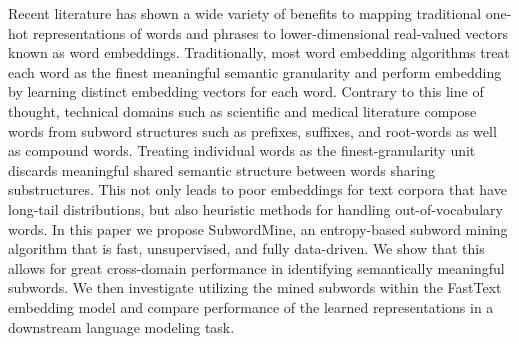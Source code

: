 Recent literature has shown a wide variety of benefits to mapping traditional one-hot representations of words and phrases to lower-dimensional real-valued vectors known as word embeddings. Traditionally, most word embedding algorithms treat each word as the finest meaningful semantic granularity and perform embedding by learning distinct embedding vectors for each word. Contrary to this line of thought, technical domains such as scientific and medical literature compose words from subword structures such as prefixes, suffixes, and root-words as well as compound words. Treating individual words as the finest-granularity unit discards meaningful shared semantic structure between words sharing substructures. This not only leads to poor embeddings for text corpora that have long-tail distributions, but also heuristic methods for handling out-of-vocabulary words. In this paper we propose SubwordMine, an entropy-based subword mining algorithm that is fast, unsupervised, and fully data-driven. We show that this allows for great cross-domain performance in identifying semantically meaningful subwords. We then investigate utilizing the mined subwords within the FastText embedding model and compare performance of the learned representations in a downstream language modeling task.
